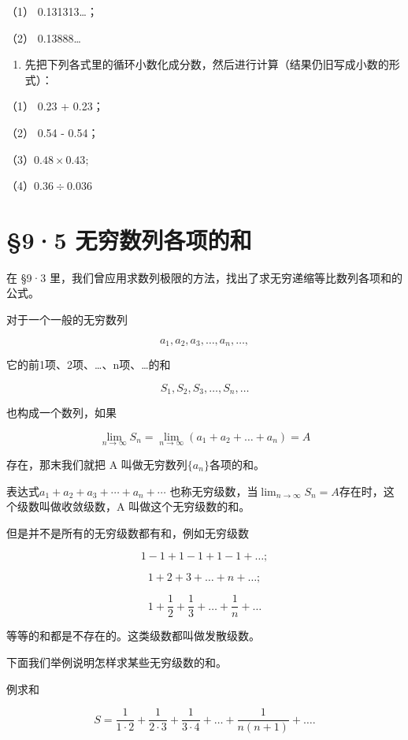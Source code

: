 （1） 0.131313\ldots；

（2） 0.13888\ldots{}

\begin{enumerate}[start=3]
\item
  先把下列各式里的循环小数化成分数，然后进行计算（结果仍旧写成小数的形式）：
\end{enumerate}

（1） 0.23 + 0.23；

（2） 0.54 - 0.54；

（3）\(0.48 \times 0.43;\)

（4）\(0.36 \div 0.036\)

\section{§9·5 无穷数列各项的和}

在 §9·3
里，我们曾应用求数列极限的方法，找出了求无穷递缩等比数列各项和的公式。

对于一个一般的无穷数列

\[
a_{1}, a_{2}, a_{3}, \dots, a_{n}, \dots, \tag {1}
\]

它的前1项、2项、\ldots、n项、\ldots 的和

\[
S_{1}, S_{2}, S_{3}, \dots, S_{n}, \dots \tag {2}
\]

也构成一个数列，如果

\[
\lim_{n \rightarrow \infty} S_{n} = \lim_{n \rightarrow \infty} (a_{1} + a_{2} + \dots + a_{n}) = A
\]

存在，那末我们就把 A 叫做无穷数列\(\{a_{n}\}\)各项的和。

表达式\(a_{1}+a_{2}+a_{3}+\cdots+a_{n}+\cdots\)
也称无穷级数，当\(\lim_{n\to\infty}S_{n}=A\)存在时，这个级数叫做收敛级数，A
叫做这个无穷级数的和。

但是并不是所有的无穷级数都有和，例如无穷级数

\[
1 - 1 + 1 - 1 + 1 - 1 + \dots;
\]

\[
1+2+3+\dots+n+\dots;
\]

\[
1 + \frac{1}{2} + \frac{1}{3} + \dots + \frac{1}{n} + \dots
\]

等等的和都是不存在的。这类级数都叫做发散级数。

下面我们举例说明怎样求某些无穷级数的和。

例求和

\[
S = \frac{1}{1 \cdot 2} + \frac{1}{2 \cdot 3} + \frac{1}{3 \cdot 4} + \dots + \frac{1}{n (n + 1)} + \dots.
\]


